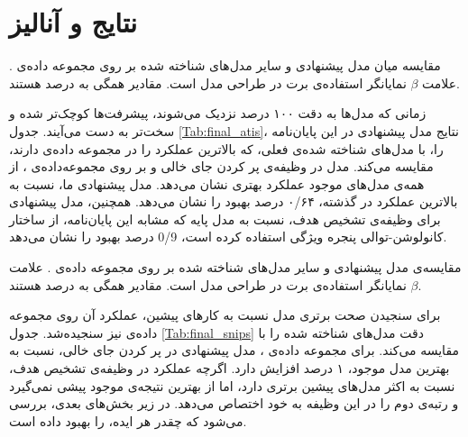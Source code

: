 \section{نتایج و آنالیز}
\begin{table}[ht]
		
	\caption[مقایسه میان مدل پیشنهادی و سایر مدل‌های شناخته شده بر روی مجموعه داده‌ی ]{
		مقایسه میان مدل پیشنهادی و سایر مدل‌های شناخته شده بر روی مجموعه داده‌ی . علامت $\beta$ نمایانگر استفاده‌ی برت در طراحی مدل است. مقادیر همگی به درصد هستند.
	}
	\label{Tab:final_atis}
\end{table}
زمانی که مدل‌ها به دقت ۱۰۰ درصد نزدیک می‌شوند، پیشرفت‌ها کوچک‌تر شده و سخت‌تر به دست می‌آیند. جدول \ref{Tab:final_atis}، نتایج مدل پیشنهادی در این پایان‌نامه را، با مدل‌های شناخته شده‌ی فعلی، که بالاترین عملکرد را در مجموعه داده‌ی  دارند، مقایسه می‌کند. مدل  در وظیفه‌ی پر کردن جای خالی و بر روی مجموعه‌داده‌ی ، از همه‌ی مدل‌های موجود عملکرد بهتری نشان می‌دهد. مدل پیشنهادی ما، نسبت به بالاترین عملکرد در گذشته، ۰‍/۶۴ درصد بهبود را نشان می‌دهد. همچنین، مدل پیشنهادی برای وظیفه‌ی تشخیص هدف، نسبت به مدل پایه  که مشابه این پایان‌نامه، از ساختار کانولوشن-توالی پنجره ویژگی استفاده کرده است، 0‍/9 درصد بهبود را نشان می‌دهد.
\begin{table}[ht]
	
	\caption[مقایسه‌ی مدل پیشنهادی و سایر مدل‌های شناخته شده بر روی مجموعه داده‌ی ]{
		مقایسه‌ی مدل پیشنهادی و سایر مدل‌های شناخته شده بر روی مجموعه داده‌ی . علامت $\beta$ نمایانگر استفاده‌ی برت در طراحی مدل است. مقادیر همگی به درصد هستند.
	}
	\label{Tab:final_snips}
\end{table}


برای سنجیدن صحت برتری مدل  نسبت به کارهای پیشین، عملکرد آن روی مجموعه داده‌ی  نیز سنجیده‌شد. جدول \ref{Tab:final_snips} دقت مدل‌های شناخته شده را با  مقایسه می‌کند. برای مجموعه داده‌ی ،  مدل پیشنهادی در پر کردن جای خالی، نسبت به بهترین مدل موجود، ۱ درصد افزایش دارد. اگرچه عملکرد  در وظیفه‌ی تشخیص هدف، نسبت به اکثر مدل‌های پیشین برتری دارد، اما از بهترین نتیجه‌ی موجود پیشی نمی‌گیرد و رتبه‌ی دوم را در این وظیفه به خود اختصاص می‌دهد.
در زیر بخش‌های بعدی، بررسی می‌شود که چقدر هر ایده،  را بهبود داده است.
